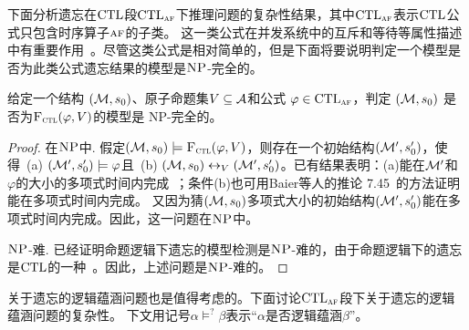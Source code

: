 下面分析遗忘在$\textrm{CTL}$段$\textrm{CTL}_{\textsc{a}\textsc{f}}$下推理问题的复杂性结果，其中$\textrm{CTL}_{\textsc{a}\textsc{f}}$表示$\textrm{CTL}$公式只包含时序算子$\textsc{a} \textsc{f}$的子类。
这一类公式在并发系统中的互斥和等待等属性描述中有重要作用~\cite{Baier:PMC:2008}。尽管这类公式是相对简单的，但是下面将要说明判定一个模型是否为此类公式遗忘结果的模型是$\textsc{NP}$-完全的。
\begin{proposition}[模型检测]
	\label{modelChecking}
	给定一个结构 $({\cal M},s_0)$、原子命题集$V\subseteq{\cal A}$和公式 $\varphi \in \textrm{CTL}_{\textsc{a}\textsc{f}}$，判定 $({\cal M},s_0)$ 是否为${\textsc{F}_{\textsc{ctl}}}(\varphi, V)$的模型是 \textsc{NP}-完全的。
\end{proposition}
\begin{proof}
	在$\textsc{NP}$中. 假定$({\cal M},s_0) \models {\textsc{F}_{\textsc{ctl}}}(\varphi,V)$，则存在一个初始结构$({\cal M}', s_0')$，使得\ (a) $({\cal M}',s_0') \models \varphi$且\ (b) $({\cal M},s_0) \leftrightarrow_V ({\cal M}',s_0')$。已有结果表明：(a)能在${\cal M}'$和 $\varphi$的大小的多项式时间内完成~\cite{DBLP:books/daglib/0007403}；条件(b)也可用Baier等人的推论 7.45~\cite{Baier:PMC:2008}的方法证明能在多项式时间内完成。
	又因为猜$({\cal M},s_0)$多项式大小的初始结构$({\cal M}',s_0')$能在多项式时间内完成。因此，这一问题在$\textsc{NP}$中。
	
	$\textsc{NP}$-难. 已经证明命题逻辑下遗忘的模型检测是$\textsc{NP}$-难的，由于命题逻辑下的遗忘是$\textrm{CTL}$的一种~\cite{Zhang2008Properties}。因此，上述问题是$\textsc{NP}$-难的。
\end{proof}

关于遗忘的逻辑蕴涵问题也是值得考虑的。下面讨论$\textrm{CTL}_{\textsc{a}\textsc{f}}$段下关于遗忘的逻辑蕴涵问题的复杂性。
下文用记号$\alpha \models^? \beta$表示“$\alpha$是否逻辑蕴涵$\beta$”。

